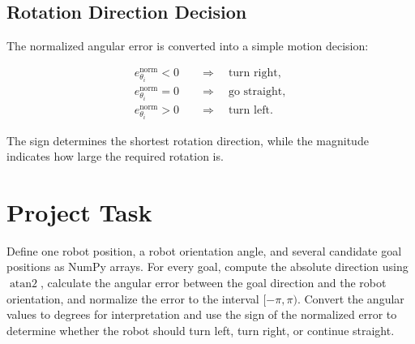 \documentclass[10pt,twocolumn,a4paper]{article}
\begin{document}
\subsection{Rotation Direction Decision}

The normalized angular error is converted into a simple motion decision:

\[
\begin{aligned}
    e_{\theta_i}^{\mathrm{norm}} < 0
    &\quad \Rightarrow \quad
    \text{turn right}, \\
    e_{\theta_i}^{\mathrm{norm}} = 0
    &\quad \Rightarrow \quad
    \text{go straight}, \\
    e_{\theta_i}^{\mathrm{norm}} > 0
    &\quad \Rightarrow \quad
    \text{turn left}.
\end{aligned}
\]

The sign determines the shortest rotation direction, while the magnitude 
indicates how large the required rotation is.

\section{Project Task}

Define one robot position, a robot orientation angle, and several 
candidate goal positions as NumPy arrays. For every goal, compute the 
absolute direction using $\operatorname{atan2}$, calculate the angular 
error between the goal direction and the robot orientation, and normalize 
the error to the interval $[-\pi,\pi)$. Convert the angular values to 
degrees for interpretation and use the sign of the normalized error to 
determine whether the robot should turn left, turn right, or continue 
straight.


\end{document}
